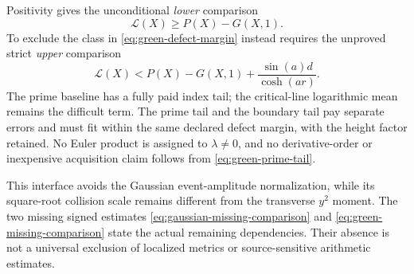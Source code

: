 Positivity gives the unconditional \emph{lower} comparison
\begin{equation}\label{eq:green-prime-lower}
 \mathcal L(X)\ge P(X)-G(X,1).
\end{equation}
To exclude the class in \eqref{eq:green-defect-margin} instead requires
the unproved strict \emph{upper} comparison
\begin{equation}\label{eq:green-missing-comparison}
 \mathcal L(X)<P(X)-G(X,1)+\frac{\sin(a)d}{\cosh(ar)}.
\end{equation}
The prime baseline has a fully paid index tail; the critical-line
logarithmic mean remains the difficult term. The prime tail and the
boundary tail pay separate errors and must fit within the same declared
defect margin, with the height factor retained. No Euler product is
assigned to \(\lambda\ne0\), and no derivative-order or inexpensive
acquisition claim follows from \eqref{eq:green-prime-tail}.

This interface avoids the Gaussian event-amplitude normalization, while
its square-root collision scale remains different from the transverse
\(y^2\) moment. The two missing signed estimates
\eqref{eq:gaussian-missing-comparison} and
\eqref{eq:green-missing-comparison} state the actual remaining
dependencies. Their absence is not a universal exclusion of localized
metrics or source-sensitive arithmetic estimates.
